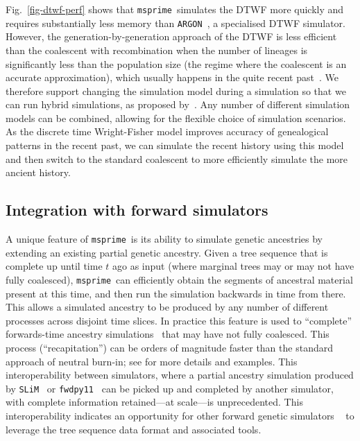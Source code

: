 \documentclass{article}
\newcommand{\msprime}[0]{\texttt{msprime}}
\newcommand{\SLiM}[0]{\texttt{SLiM}}
\newcommand{\fwdpy}[0]{\texttt{fwdpy11}}
\newcommand{\ARGON}[0]{\texttt{ARGON}}
\begin{document}
Fig.~\ref{fig-dtwf-perf} shows that \msprime\ simulates the DTWF
more quickly and requires substantially less memory than
\ARGON~\citep{palamara2016argon}, a specialised DTWF simulator.
However, the generation-by-generation approach of the DTWF is less
efficient than the coalescent with recombination when the
number of lineages is significantly less than the population size
(the regime where the coalescent is an accurate approximation),
which usually happens in the quite recent
past~\citep{bhaskar2014distortion}.
We therefore support changing the simulation model during a simulation
so that we can run hybrid simulations, as proposed by~\cite{bhaskar2014distortion}.
Any number of different simulation models can be combined, allowing for the
flexible choice of simulation scenarios.
As the discrete time Wright-Fisher model improves accuracy of genealogical
patterns in the recent past, we can simulate the recent history using this
model and then switch to the standard coalescent to more efficiently simulate
the more ancient history.

\subsection*{Integration with forward simulators}
A unique feature of \msprime\ is its ability to simulate
genetic ancestries by extending an existing partial
genetic ancestry. Given a tree sequence that
is complete up until time $t$ ago as input
(where marginal trees may or may not have fully coalesced),
\msprime\ can efficiently obtain the segments of ancestral material
present at this time, and then run the simulation backwards in time from there.
This allows a simulated ancestry to be produced by any
number of different processes across disjoint time slices.
In practice this feature is used to ``complete''
forwards-time ancestry simulations~\citep{kelleher2018efficient}
that may have not fully coalesced. This process
(``recapitation'') can be orders of magnitude faster than
the standard approach of neutral burn-in; see
\cite{haller2018tree} for more details and examples.
This interoperability between simulators, where a partial ancestry
simulation produced by \SLiM~\citep{haller2019slim}
or \fwdpy~\citep{thornton2014cpp} can be picked up and completed
by another simulator, with complete information
retained---at scale---is unprecedented.
This interoperability indicates an opportunity for
other forward genetic simulators ~\citep[e.g.][]{Gaynor2021AlphaSimR}
to leverage the tree sequence data format and associated tools.
\end{document}
